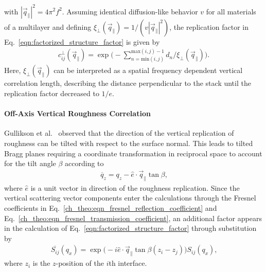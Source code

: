 with $|\vec{q}_\parallel|^2 = 4 \pi^2 f^2$. Assuming identical diffusion-like behavior $v$ for all materials of a multilayer and defining $\xi_\perp(\vec{q}_\parallel) = 1/(v |\vec{q}_\parallel|^2)$, the replication factor in Eq.~\eqref{eqn:factorized_structure_factor} is given by
\begin{align}
c_{ij}^\perp(\vec{q}_\parallel) =  \exp\Bigg(-\sum \limits_{n = \text{min}(i,j)}^{\text{max}(i,j)-1}d_n/\xi_\perp(\vec{q}_\parallel) \Bigg)\text{.}
\end{align}
Here, $\xi_\perp(\vec{q}_\parallel)$ can be interpreted as a spatial frequency dependent vertical correlation length, describing the distance perpendicular to the stack until the replication factor decreased to $1/e$.

\paragraph{Off-Axis Vertical Roughness Correlation}
Gullikson et al.~\cite{gullikson_asymmetric_1999} observed that the direction of the vertical replication of roughness can be tilted with respect to the surface normal. This leads to tilted Bragg planes requiring a coordinate transformation in reciprocal space to account for the tilt angle $\beta$ according to
\begin{align}
\overline{q}_z = q_z - \hat{e} \cdot \vec{q}_\parallel   \tan \beta\text{,}
\end{align}
where $\hat{e}$ is a unit vector in direction of the roughness replication. Since the vertical scattering vector components enter the calculations through the Fresnel coefficients in Eq.~\eqref{ch_theo:eqn_fresnel_reflection_coefficient} and Eq.~\eqref{ch_theo:eqn_fresnel_transmission_coefficient}, an additional factor appears in the calculation of Eq.~\eqref{eqn:factorized_structure_factor} through substitution by
\begin{align}
\overline{S_{ij}}(q_x) = \exp\Big(-i \hat{e} \cdot \vec{q}_\parallel \tan \beta (z_i-z_j)\Big)  S_{ij}(q_x) \text{,} \label{eqn:tilt_correction}
\end{align}
where $z_i$ is the $z$-position of the $i$th interface.

